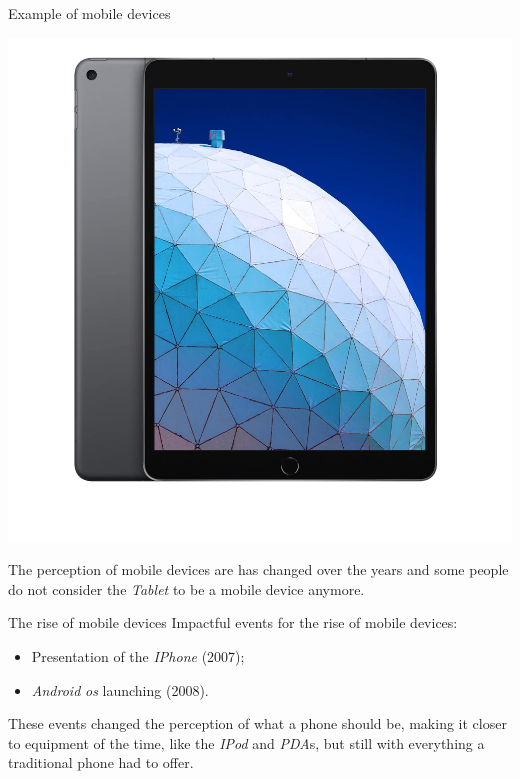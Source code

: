 \documentclass[dvipsnames, handout]{beamer}
\newcommand{\1}{\mathds{1}}	%
\begin{document}
\begin{frame}{Example of mobile devices}
\begin{center}
\includegraphics[scale=0.4]{presentation/ipad.png}  
\end{center}
\pause
The perception of mobile devices are has changed over the years and some people do not consider the \emph{Tablet} to be a mobile device anymore.
\end{frame}

\begin{frame}{The rise of mobile devices}
Impactful events for the rise of mobile devices:
\pause
\begin{itemize}
    \item Presentation of the \emph{IPhone} (2007);
    \item \emph{Android} \emph{os} launching (2008).
\end{itemize}
\pause
These events changed the perception of what a phone should be, making it closer to equipment of the time, like the \emph{IPod} and \emph{PDA}s, but still with everything a traditional phone had to offer.
\end{frame}
\end{document}
